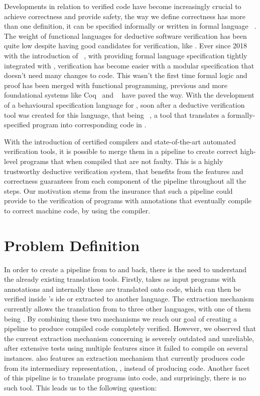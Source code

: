 Developments in relation to verified code have become increasingly crucial to achieve correctness and provide safety, 
the way we define correctness has more than one definition, it can be specified informally or written in formal language 
~\cite{Filliatre11}. The weight of functional languages for deductive software verification has been quite low despite having
good candidates for verification, like \ocaml. Ever since 2018 with the introduction of \gospel~\cite{ChargueraudFLP19}, with providing
formal language specification tightly integrated with \ocaml, verification has become easier with a modular specification
that doesn't need many changes to \ocaml code. This wasn't the first time formal logic and proof has been merged with 
functional programming, previous and more foundational systems like Coq~\cite{75277.75285} and \whyml~\cite{FilliatreP13} have
paved the way. With the development of a behavioural specification language for \ocaml, soon after a deductive verification tool
was created for this language, that being \cameleer~\cite{PereiraR20}, a tool that translates a formally-specified program into 
corresponding code in \whyml.

With the introduction of certified compilers and state-of-the-art automated verification tools, it is possible to merge them in
a pipeline to create correct high-level programs that when compiled that are not faulty.
This is a highly trustworthy deductive verification system, that benefits from the features and correctness guarantees from each 
component of the pipeline throughout all the steps. Our motivation stems from the insurance that such a pipeline could provide 
to the verification of \ocaml programs with \gospel annotations that eventually compile to correct machine code, by using the \cml
compiler.


\section{Problem Definition}
\label{sec:Problem_Definition}

In order to create a pipeline from \ocaml to \cml and back, there is the need to understand the already existing translation tools.
Firstly, \cameleer takes as input \ocaml programs with \gospel annotations and internally these are translated onto \whyml code, which
can then be verified inside \whythree's ide or extracted to another language. The \whythree extraction mechanism currently allows the 
translation from \whyml to three other languages, with one of them being \cml. By combining these two mechanisms we reach our goal
of creating a pipeline to produce compiled code completely verified. However, we observed that the current extraction mechanism 
concerning \cml is severely outdated and unreliable, after extensive tests using multiple \ocaml features since it failed to compile 
on several instances. \cameleer also features an extraction mechanism that currently produces \ocaml code from its intermediary
representation, \whyml, instead of producing \cml code. Another facet of this pipeline is to translate \cml programs into \ocaml
code, and surprisingly, there is no such tool. This leads us to the following question: 

